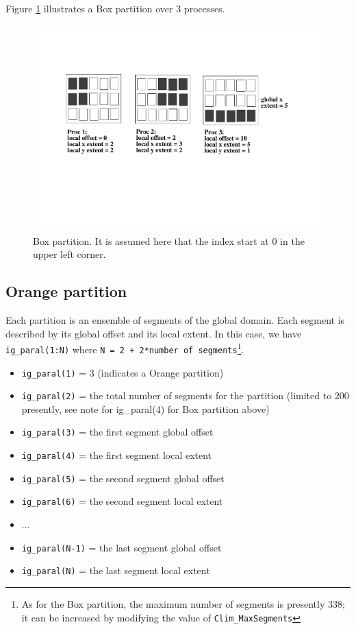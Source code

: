 Figure \ref{box_partition} illustrates a Box partition over 3
processes.  
 
\begin{figure}
\includegraphics[scale=.6]{figures/box_new} 
\caption{Box partition. It is assumed here that the index start at 0 in the upper left corner.}
\label{box_partition}
\end{figure} 
  
\subsection{Orange partition}

Each partition is an ensemble of segments of the global domain. Each
segment is described by its global offset and its local extent.  In
this case, we have {\tt ig\_paral(1:N)} where {\tt N = 2 + 2*number of
segments}\footnote{As for the Box partition, the maximum number of
segments is presently 338; it can be increased by modifying the value
of {\tt Clim\_MaxSegments}}.

\begin{itemize}
 \item {\tt ig\_paral(1)} = 3 (indicates a Orange partition)
 \item {\tt ig\_paral(2)} = the total number of segments for the partition (limited to 200 presently, see note for ig\_paral(4) for Box partition above)
 \item {\tt ig\_paral(3)} = the first segment global offset
 \item {\tt ig\_paral(4)} = the first segment local extent
 \item {\tt ig\_paral(5)} = the second segment global offset
 \item {\tt ig\_paral(6)} = the second segment local extent
 \item ...
 \item {\tt ig\_paral(N-1)} = the last segment global offset
 \item {\tt ig\_paral(N)} = the last segment local extent
\end{itemize}

